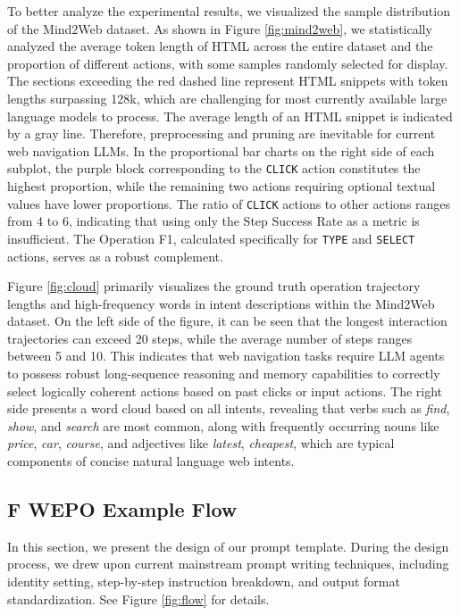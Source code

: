 \documentclass{article}
\begin{document}
To better analyze the experimental results, we visualized the sample distribution of the Mind2Web dataset. As shown in Figure \ref{fig:mind2web}, we statistically analyzed the average token length of HTML across the entire dataset and the proportion of different actions, with some samples randomly selected for display. The sections exceeding the red dashed line represent HTML snippets with token lengths surpassing 128k, which are challenging for most currently available large language models to process. The average length of an HTML snippet is indicated by a gray line. Therefore, preprocessing and pruning are inevitable for current web navigation LLMs. In the proportional bar charts on the right side of each subplot, the purple block corresponding to the \texttt{CLICK} action constitutes the highest proportion, while the remaining two actions requiring optional textual values have lower proportions. The ratio of \texttt{CLICK} actions to other actions ranges from $4$ to $6$, indicating that using only the Step Success Rate as a metric is insufficient. The Operation F1, calculated specifically for \texttt{TYPE} and \texttt{SELECT} actions, serves as a robust complement.

Figure \ref{fig:cloud} primarily visualizes the ground truth operation trajectory lengths and high-frequency words in intent descriptions within the Mind2Web dataset. On the left side of the figure, it can be seen that the longest interaction trajectories can exceed 20 steps, while the average number of steps ranges between 5 and 10. This indicates that web navigation tasks require LLM agents to possess robust long-sequence reasoning and memory capabilities to correctly select logically coherent actions based on past clicks or input actions. The right side presents a word cloud based on all intents, revealing that verbs such as \textit{find}, \textit{show}, and \textit{search} are most common, along with frequently occurring nouns like \textit{price}, \textit{car}, \textit{course}, and adjectives like \textit{latest}, \textit{cheapest}, which are typical components of concise natural language web intents.

\subsection*{F WEPO Example Flow}
\label{sec:flow}

In this section, we present the design of our prompt template. During the design process, we drew upon current mainstream prompt writing techniques, including identity setting, step-by-step instruction breakdown, and output format standardization. See Figure \ref{fig:flow} for details.
\end{document}
